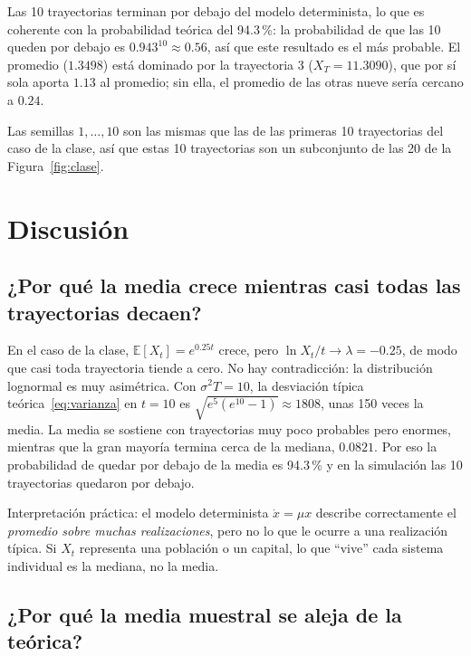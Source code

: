 \documentclass[11pt,a4paper]{article}
\newcommand{\E}{\mathbb{E}}
\begin{document}
Las 10 trayectorias terminan por debajo del modelo determinista, lo que es coherente con la probabilidad teórica del 94.3\,\%: la probabilidad de que las 10 queden por debajo es $0.943^{10} \approx 0.56$, así que este resultado es el más probable. El promedio ($1.3498$) está dominado por la trayectoria 3 ($X_T = 11.3090$), que por sí sola aporta $1.13$ al promedio; sin ella, el promedio de las otras nueve sería cercano a $0.24$.

Las semillas $1,\ldots,10$ son las mismas que las de las primeras 10 trayectorias del caso de la clase, así que estas 10 trayectorias son un subconjunto de las 20 de la Figura~\ref{fig:clase}.

\section{Discusión}
\label{sec:discusion}

\subsection{¿Por qué la media crece mientras casi todas las trayectorias decaen?}

En el caso de la clase, $\E[X_t] = e^{0.25t}$ crece, pero $\ln X_t / t \to \lambda = -0.25$, de modo que casi toda trayectoria tiende a cero. No hay contradicción: la distribución lognormal es muy asimétrica. Con $\sigma^2 T = 10$, la desviación típica teórica~\eqref{eq:varianza} en $t = 10$ es $\sqrt{e^{5}(e^{10} - 1)} \approx 1808$, unas 150 veces la media. La media se sostiene con trayectorias muy poco probables pero enormes, mientras que la gran mayoría termina cerca de la mediana, $0.0821$. Por eso la probabilidad de quedar por debajo de la media es 94.3\,\% y en la simulación las 10 trayectorias quedaron por debajo.

Interpretación práctica: el modelo determinista $\dot x = \mu x$ describe correctamente el \emph{promedio sobre muchas realizaciones}, pero no lo que le ocurre a una realización típica. Si $X_t$ representa una población o un capital, lo que ``vive'' cada sistema individual es la mediana, no la media.

\subsection{¿Por qué la media muestral se aleja de la teórica?}
\end{document}
